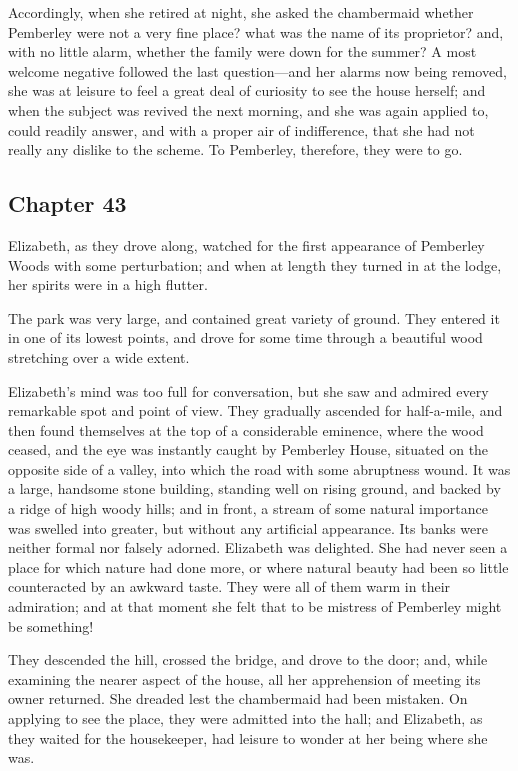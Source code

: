 Accordingly, when she retired at night, she asked the chambermaid whether Pemberley were not a very fine place? what was the name of its proprietor? and, with no little alarm, whether the family were down for the summer? A most welcome negative followed the last question---and her alarms now being removed, she was at leisure to feel a great deal of curiosity to see the house herself; and when the subject was revived the next morning, and she was again applied to, could readily answer, and with a proper air of indifference, that she had not really any dislike to the scheme. To Pemberley, therefore, they were to go.

\subsection[chapter-43]{\useURL[url43][][][]\from[url43] Chapter 43}

Elizabeth, as they drove along, watched for the first appearance of Pemberley Woods with some perturbation; and when at length they turned in at the lodge, her spirits were in a high flutter.

The park was very large, and contained great variety of ground. They entered it in one of its lowest points, and drove for some time through a beautiful wood stretching over a wide extent.

Elizabeth's mind was too full for conversation, but she saw and admired every remarkable spot and point of view. They gradually ascended for half-a-mile, and then found themselves at the top of a considerable eminence, where the wood ceased, and the eye was instantly caught by Pemberley House, situated on the opposite side of a valley, into which the road with some abruptness wound. It was a large, handsome stone building, standing well on rising ground, and backed by a ridge of high woody hills; and in front, a stream of some natural importance was swelled into greater, but without any artificial appearance. Its banks were neither formal nor falsely adorned. Elizabeth was delighted. She had never seen a place for which nature had done more, or where natural beauty had been so little counteracted by an awkward taste. They were all of them warm in their admiration; and at that moment she felt that to be mistress of Pemberley might be something!

They descended the hill, crossed the bridge, and drove to the door; and, while examining the nearer aspect of the house, all her apprehension of meeting its owner returned. She dreaded lest the chambermaid had been mistaken. On applying to see the place, they were admitted into the hall; and Elizabeth, as they waited for the housekeeper, had leisure to wonder at her being where she was.

